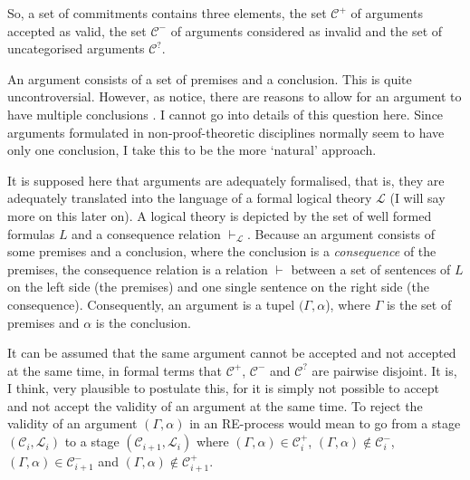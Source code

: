 \documentclass{article}
\begin{document}
So, a set of commitments contains three elements, the set $\mathcal{C}^+$ of arguments accepted as valid, the set $\mathcal{C}^-$ of arguments considered as invalid and the set of uncategorised arguments $\mathcal{C}^?$.%

An argument consists of a set of premises and a conclusion. This is quite uncontroversial. However, as \citeauthor{beallrestall} notice, there are reasons to allow for an argument to have multiple conclusions \cite[p.~14]{beallrestall}. I cannot go into details of this question here. Since arguments formulated in non-proof-theoretic disciplines normally seem to have only one conclusion, I take this to be the more `natural' approach. 

It is supposed here that arguments are adequately formalised, that is, they are adequately translated into the language of a formal logical theory $\mathcal{L}$ (I will say more on this later on). A logical theory is depicted by the set of well formed formulas $L$ and a consequence relation $\vdash_\mathcal{L}$. Because an argument consists of some premises and a conclusion, where the conclusion is a \textit{consequence} of the premises, the consequence relation is a relation $\vdash$ between a set of sentences of $L$ on the left side (the premises) and one single sentence on the right side (the consequence). Consequently, an argument is a tupel $(\Gamma,\alpha$), where $\Gamma$ is the set of premises and $\alpha$ is the conclusion.

It can be assumed that the same argument cannot be accepted and not accepted at the same time, in formal terms that $\mathcal{C}^+$, $\mathcal{C}^-$ and $\mathcal{C}^?$ are pairwise disjoint. It is, I think, very plausible to postulate this, for it is simply not possible to accept and not accept the validity of an argument at the same time. To reject the validity of an argument $(\Gamma,\alpha)$ in an RE-process would mean to go from a stage $(\mathcal{C}_i,\mathcal{L}_i)$ to a stage $(\mathcal{C}_{i+1},\mathcal{L}_i)$ where $(\Gamma,\alpha)\in\mathcal{C}_i^+$, $(\Gamma,\alpha)\notin\mathcal{C}_i^-$, $(\Gamma,\alpha)\in\mathcal{C}_{i+1}^-$ and $(\Gamma,\alpha)\notin\mathcal{C}_{i+1}^+$. %
\end{document}
